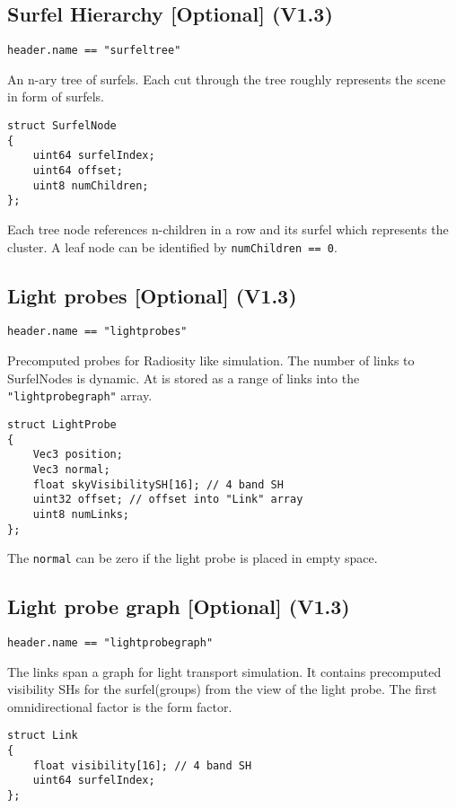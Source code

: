 \documentclass[english,10pt,a4paper,twocolumn,colorscheme=green]{orarticle}
\begin{document}
	\subsection{Surfel Hierarchy [Optional] (V1.3)}
	\lstinline|header.name == "surfeltree"|
	
	An n-ary tree of surfels. Each cut through the tree roughly represents the scene in form of surfels.
	\begin{lstlisting}
struct SurfelNode
{
	uint64 surfelIndex;
	uint64 offset;
	uint8 numChildren;
};
	\end{lstlisting}
	Each tree node references n-children in a row and its surfel which represents the cluster. A leaf node can be identified by \lstinline|numChildren == 0|.
	
	\subsection{Light probes [Optional] (V1.3)}
	\lstinline|header.name == "lightprobes"|
	
	Precomputed probes for Radiosity like simulation. The number of links to SurfelNodes is dynamic. At is stored as a range of links into the \lstinline|"lightprobegraph"| array.
	
\begin{lstlisting}
struct LightProbe
{
	Vec3 position;
	Vec3 normal;
	float skyVisibilitySH[16]; // 4 band SH
	uint32 offset; // offset into "Link" array
	uint8 numLinks;
};
\end{lstlisting}

	The \lstinline|normal| can be zero if the light probe is placed in empty space.
		
	\subsection{Light probe graph [Optional] (V1.3)}
	\lstinline|header.name == "lightprobegraph"|
	
	The links span a graph for light transport simulation. It contains precomputed visibility SHs for the surfel(groups) from the view of the light probe. The first omnidirectional factor is the form factor. 
\begin{lstlisting}
struct Link
{
	float visibility[16]; // 4 band SH
	uint64 surfelIndex;
};
\end{lstlisting}
	
\end{document}
